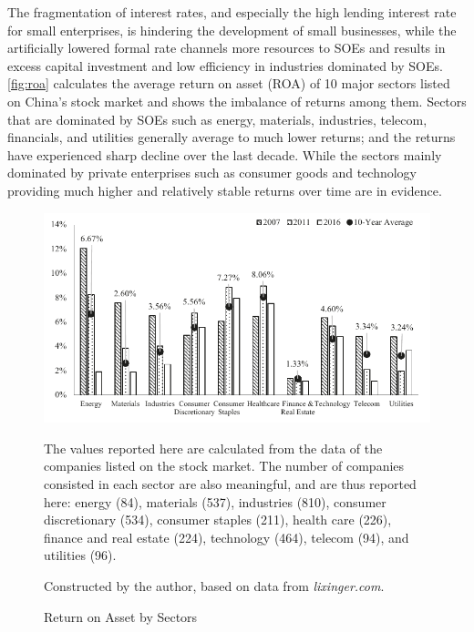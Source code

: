 \documentclass[AER]{AEA}
\begin{document}
The fragmentation of interest rates, and especially the high lending 
interest rate for small enterprises, is hindering the development of small 
businesses, while the artificially lowered formal rate channels more 
resources to SOEs and results in excess capital investment and low 
efficiency in industries dominated by SOEs. \autoref{fig:roa} 
calculates the average return on asset (ROA) of 10 major sectors 
listed on China's stock market and shows the imbalance of returns 
among them. Sectors that are dominated by SOEs such as energy, 
materials, industries, telecom, financials, and utilities 
generally average to much lower returns; and the returns have 
experienced sharp decline over the last decade. While the sectors 
mainly dominated by private enterprises such as consumer goods 
and technology providing much higher and relatively stable returns  
over time are in evidence.
 
\begin{figure}[!htb]
\centering
\includegraphics[scale=1]{fig/roa.pdf}
\caption{Return on Asset by Sectors}
\begin{figurenotes}
The values reported here are calculated from the data of the companies listed 
on the stock market. The number of companies consisted in each sector are 
also meaningful, and are thus reported here: energy (84), materials (537), 
industries (810), consumer discretionary (534), consumer staples (211), 
health care (226), finance and real estate (224), technology (464), 
telecom (94), and utilities (96).
\end{figurenotes}
\begin{figurenotes}[Source]
Constructed by the author, based on data from \textit{lixinger.com}.
\end{figurenotes}
\label{fig:roa}
\end{figure}
\end{document}
